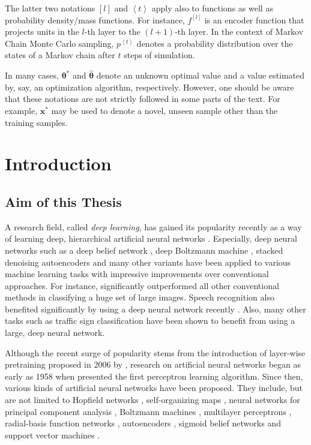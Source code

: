 \documentclass[dissertation,nocontribution]{aaltoseries}
\newcommand{\qt}[1]{\left<#1\right>}
\newcommand{\qlay}[1]{\left[#1\right]}
\newcommand{\vect}[1]{\mathbf{#1}}
\newcommand{\vects}[1]{\boldsymbol{#1}}
\newcommand{\vx}[0]{\vect{x}}
\newcommand{\TT}[0]{{\vects{\theta}}}
\begin{document}
The latter two notations $\qlay{l}$ and $\qt{t}$ apply also
to functions as well as probability density/mass functions.
For instance, $f^{\qlay{l}}$ is an encoder function that
projects units in the $l$-th layer to the $(l+1)$-th layer.
In the context of Markov Chain Monte Carlo sampling, 
$p^{\qt{t}}$ denotes a probability distribution over the
states of a Markov chain after $t$ steps of simulation.

In many cases, $\TT^*$ and $\hat{\TT}$ denote an unknown
optimal value and a value estimated by, say, an optimization
algorithm, respectively. However, one should be aware that
these notations are not strictly followed in some parts of
the text. For example, $\vx^*$ may be used to denote a
novel, unseen sample other than the training samples.










\chapter{Introduction}


\section{Aim of this Thesis}

A research field, called \textit{deep learning}, has gained
its popularity recently as a way of learning deep,
hierarchical artificial neural networks \citep[see, for
example,][]{Bengio2009a}.  Especially, deep neural networks
such as a deep belief network \citep{Hinton2006nc}, deep
Boltzmann machine \citep{Salakhutdinov2009a}, stacked
denoising autoencoders \citep{Vincent2010} and many other
variants have been applied to various machine learning tasks
with impressive improvements over conventional approaches.
For instance, \citet{Krizhevsky2012} significantly
outperformed all other conventional methods in classifying a
huge set of large images. Speech recognition also benefited
significantly by using a deep neural network recently
\citep{Hinton2012sp}. Also, many other tasks such as traffic
sign classification \citep{Ciresan2012c} have been shown to
benefit from using a large, deep neural network.

Although the recent surge of popularity stems from the
introduction of layer-wise pretraining proposed in 2006 by
\citet{Hinton2006,Bengio2007nips,Ranzato2007}, research on
artificial neural networks began as early as 1958 when
\citet{Rosenblatt1958} presented the first perceptron
learning algorithm. Since then, various kinds of artificial
neural networks have been proposed. They include, but are
not limited to Hopfield networks \citep{Hopfield1982},
self-organizing maps \citep{Kohonen1982}, neural networks
for principal component analysis \citep{Oja1982}, Boltzmann
machines \citep{Ackley1985}, multilayer perceptrons
\citep{Rumelhart1986}, radial-basis function networks
\citep{Broomhead1988}, autoencoders \citep{Baldi1989},
sigmoid belief networks \citep{Neal1992} and support vector
machines \citep{Cortes1995}.
\end{document}

